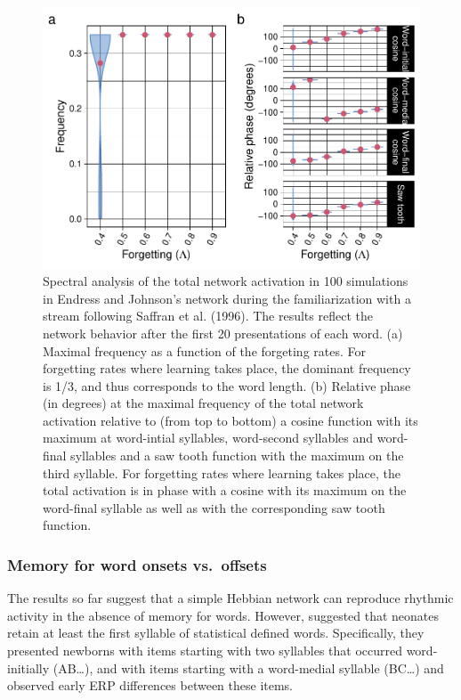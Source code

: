 \documentclass[
]{article}
\begin{document}
\begin{figure}
\includegraphics[width=1\linewidth]{tp_model_entrainment_files/figure-latex/basic-experiment-global-print-freq-phase-plot-1} \caption{Spectral analysis of the total network activation in 100 simulations in Endress and Johnson's network during the familiarization with a stream following Saffran et al. (1996). The results reflect the network behavior after the first 20 presentations of each word. (a) Maximal frequency as a function of the forgeting rates. For forgetting rates where learning takes place, the dominant frequency is 1/3, and thus corresponds to the word length. (b) Relative phase (in degrees) at the maximal frequency of the total network activation relative to (from top to bottom) a cosine function with its maximum at word-intial syllables, word-second syllables and word-final syllables and a saw tooth function with the maximum on the third syllable. For forgetting rates where learning takes place, the total activation is in phase with a cosine with its maximum on the word-final syllable as well as with the corresponding saw tooth function.}\label{fig:basic-experiment-global-print-freq-phase-plot}
\end{figure}

\hypertarget{memory-for-word-onsets-vs.-offsets-flo2022}{%
\subsubsection{\texorpdfstring{Memory for word onsets vs.~offsets
\citep{Flo2022}}{Memory for word onsets vs.~offsets {[}@Flo2022{]}}}\label{memory-for-word-onsets-vs.-offsets-flo2022}}

The results so far suggest that a simple Hebbian network can reproduce
rhythmic activity in the absence of memory for words. However,
\citep{Flo2022} suggested that neonates retain at least the first
syllable of statistical defined words. Specifically, they presented
newborns with items starting with two syllables that occurred
word-initially (AB\ldots), and with items starting with a word-medial
syllable (BC\ldots) and observed early ERP differences between these
items.
\end{document}
